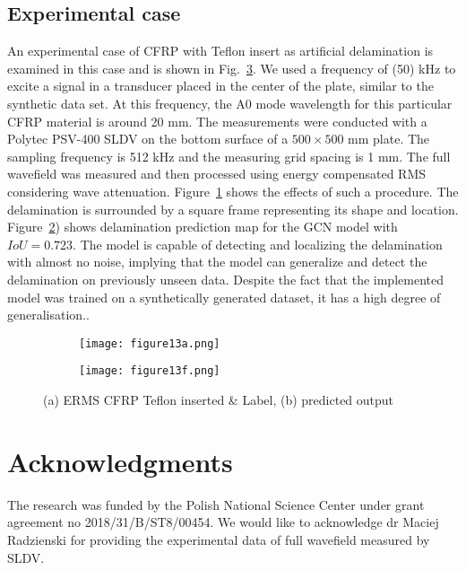 \documentclass[runningheads]{llncs}
\begin{document}
\subsection{Experimental case}
An experimental case of CFRP with Teflon insert as artificial delamination is examined in this case and is shown in Fig.~\ref{fig:Exp_ERMS_teflon}.
We used a frequency of (50) kHz to excite a signal in a transducer placed in the center of the plate, similar to the synthetic data set. 
At this frequency, the A0 mode wavelength for this particular CFRP material is around 20 mm.
The measurements were conducted with a Polytec PSV-400 SLDV on the bottom surface of a \(500 \times 500\) mm plate.
The sampling frequency is 512 kHz and the measuring grid spacing is 1 mm.
The full wavefield was measured and then processed using energy compensated RMS considering wave attenuation.
Figure~\ref{fig:Delamination} shows the effects of such a procedure.
The delamination is surrounded by a square frame representing its shape and location. 
Figure~\ref{fig:gcn_exp}) shows delamination prediction map for the GCN model with \(IoU = 0.723\). 
The model is capable of detecting and localizing the delamination with almost no noise, implying that the model can generalize and detect the delamination on previously unseen data.
Despite the fact that the implemented model was trained on a synthetically generated dataset, it has a high degree of generalisation.. 
\begin{figure} [!ht]
	\centering
	\begin{subfigure}[b]{0.47\textwidth}
		\centering
		\texttt{[image: figure13a.png]}
		\caption{}
		\label{fig:Delamination}	
	\end{subfigure}	
	\begin{subfigure}[b]{0.47\textwidth}
		\centering
		\texttt{[image: figure13f.png]}
		\caption{} 
		\label{fig:gcn_exp}
	\end{subfigure}
	\caption{(a) ERMS CFRP Teflon inserted \& Label, (b) predicted output}
	\label{fig:Exp_ERMS_teflon}
\end{figure}
\section*{Acknowledgments}
The research was funded by the Polish National Science Center under grant agreement no 2018/31/B/ST8/00454.
We would like to acknowledge dr Maciej Radzienski for providing the experimental data of full wavefield measured by SLDV.



\end{document}
